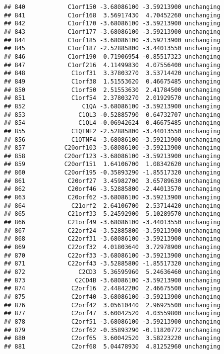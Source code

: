 \documentclass[]{article}
\begin{document}
\begin{verbatim}
## 840            C1orf150 -3.68086100 -3.59213900 unchanging
## 841            C1orf168  3.56917430  4.70452260 unchanging
## 842            C1orf170 -3.68086100 -3.59213900 unchanging
## 843            C1orf177 -3.68086100 -3.59213900 unchanging
## 844            C1orf185 -3.68086100 -3.59213900 unchanging
## 845            C1orf187 -2.52885800 -3.44013550 unchanging
## 846            C1orf190  0.71906954 -0.85517323 unchanging
## 847            C1orf216  4.11499830  4.07556400 unchanging
## 848             C1orf31  3.37803270  3.53714420 unchanging
## 849             C1orf38  1.51553620  0.46675485 unchanging
## 850             C1orf50  2.51553630  2.41784500 unchanging
## 851             C1orf54  2.37803270  2.01929570 unchanging
## 852                C1QA -3.68086100 -3.59213900 unchanging
## 853               C1QL3 -0.52885790  0.64732707 unchanging
## 854               C1QL4 -0.06942624  0.46675485 unchanging
## 855             C1QTNF2 -2.52885800 -3.44013550 unchanging
## 856             C1QTNF4 -3.68086100 -3.59213900 unchanging
## 857           C20orf103 -3.68086100 -3.59213900 unchanging
## 858           C20orf123 -3.68086100 -3.59213900 unchanging
## 859           C20orf151  1.64106700  1.08342620 unchanging
## 860           C20orf195 -0.35893290 -1.85517320 unchanging
## 861            C20orf27  3.45982700  3.65789630 unchanging
## 862            C20orf46 -3.52885800 -2.44013570 unchanging
## 863            C20orf62 -3.68086100 -3.59213900 unchanging
## 864             C21orf2  2.64106700  2.53714420 unchanging
## 865            C21orf33  5.24592900  5.10289570 unchanging
## 866            C21orf49 -3.68086100 -3.44013550 unchanging
## 867            C22orf24 -3.52885800 -3.59213900 unchanging
## 868            C22orf31 -3.68086100 -3.59213900 unchanging
## 869            C22orf32  4.01803640  3.72978900 unchanging
## 870            C22orf33 -3.68086100 -3.59213900 unchanging
## 871            C22orf43 -3.52885800 -1.85517320 unchanging
## 872               C2CD3  5.36595960  5.24636460 unchanging
## 873              C2CD4B -3.68086100 -3.59213900 unchanging
## 874             C2orf16  2.44842200  2.46675500 unchanging
## 875             C2orf40 -3.68086100 -3.59213900 unchanging
## 876             C2orf42  3.05610440  2.96925500 unchanging
## 877             C2orf47  3.60042520  4.03559800 unchanging
## 878             C2orf51 -3.68086100 -3.59213900 unchanging
## 879             C2orf62 -0.35893290 -0.11820772 unchanging
## 880             C2orf65  3.60042520  3.58223220 unchanging
## 881             C2orf68  5.04478930  4.81252960 unchanging

\end{verbatim}
\end{document}
